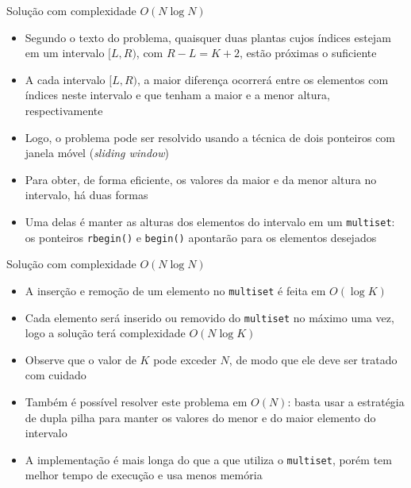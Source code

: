 \begin{frame}[fragile]{Solução com complexidade $O(N\log N)$}

    \begin{itemize}
        \item Segundo o texto do problema, quaisquer duas plantas cujos índices estejam em um
            intervalo $[L, R)$, com $R - L = K + 2$, estão próximas o suficiente

        \item A cada intervalo $[L, R)$, a maior diferença ocorrerá entre os elementos com 
            índices neste intervalo e que tenham a maior e a menor altura, respectivamente

        \item Logo, o problema pode ser resolvido usando a técnica de dois ponteiros com janela
            móvel (\textit{sliding window})

        \item Para obter, de forma eficiente, os valores da maior e da menor altura no intervalo,
            há duas formas

        \item Uma delas é manter as alturas dos elementos do intervalo em um \texttt{multiset}:
            os ponteiros \texttt{rbegin()} e \texttt{begin()} apontarão para os elementos
            desejados
   \end{itemize}

\end{frame}

\begin{frame}[fragile]{Solução com complexidade $O(N\log N)$}

    \begin{itemize}
        \item A inserção e remoção de um elemento no \texttt{multiset} é feita em $O(\log K)$

        \item Cada elemento será inserido ou removido do \texttt{multiset} no máximo uma vez, logo
            a solução terá complexidade $O(N\log K)$

        \item Observe que o valor de $K$ pode exceder $N$, de modo que ele deve ser tratado com
            cuidado

        \item Também é possível resolver este problema em $O(N)$: basta usar a estratégia de 
            dupla pilha para manter os valores do menor e do maior elemento do intervalo    

        \item A implementação é mais longa do que a que utiliza o \texttt{multiset}, porém tem
            melhor tempo de execução e usa menos memória
    \end{itemize}

\end{frame}

